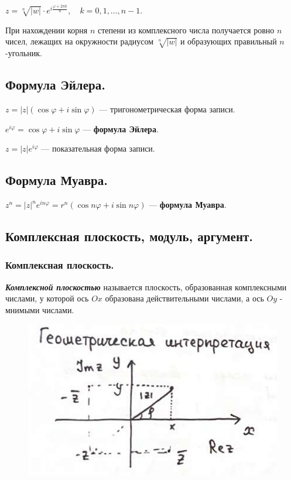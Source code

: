 $z = \sqrt[n]{|w|} \cdot e^{i \frac{\varphi + 2 \pi k}{n}}, \quad k = 0, 1, \ldots, n - 1.$

При нахождении корня $n$ степени из комплексного числа получается ровно $n$ чисел, лежащих на окружности радиусом $\sqrt[n]{|w|}$ и образующих правильный $n$-угольник.

\subsection{
    Формула Эйлера.
}

$z = |z|(\cos \varphi + i \sin \varphi)$ — тригонометрическая форма записи.

$e^{i\varphi} = \cos \varphi + i \sin \varphi$ — \textbf{формула Эйлера}.

$z = |z|e^{i\varphi}$ — показательная форма записи.


\subsection{
    Формула Муавра.
}

$z^n = |z|^n e^{in\varphi} = r^n(\cos n \varphi + i \sin n \varphi)$ — \textbf{формула Муавра}.


\newpage


\subsection{
    Комплексная плоскость, модуль, аргумент.
}

\subsubsection{
    Комплексная плоскость.
}

\begin{definition}
    \textbf{\textit{Комплексной плоскостью}} называется плоскость, образованная комплексными числами, у которой ось $Ox$ образована действительными числами, а ось $Oy$ - мнимыми числами.
\end{definition}

\begin{figure}[H]
    \centering
    \includegraphics[scale=0.55]{images/1_1.jpg}
    \label{fig:picture_1_1}
\end{figure}

